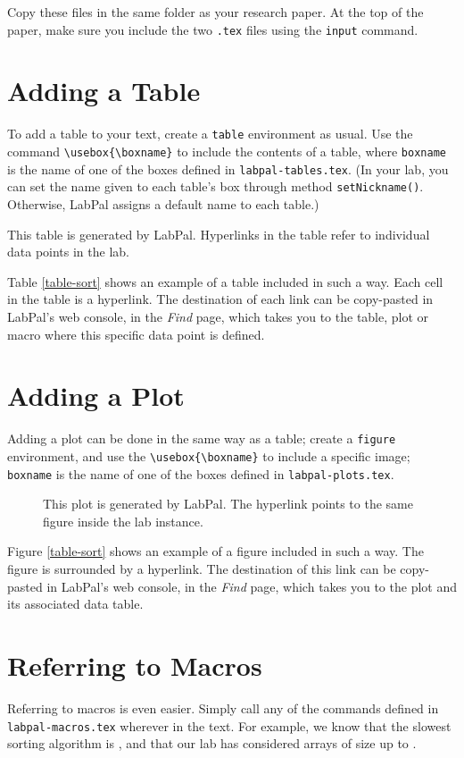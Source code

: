 \documentclass[utf8,twocolumn]{article}
\begin{document}
Copy these files in the same folder as your research paper. At the top
of the paper, make sure you include the two \texttt{.tex} files using the \texttt{input}
command.

\section*{Adding a Table}

To add a table to your text, create a \texttt{table} environment as usual. Use
the command \verb+\usebox{\boxname}+ to include the contents of a table, where
\verb+boxname+ is the name of one of the boxes defined in
\verb+labpal-tables.tex+. (In your lab, you can set the name given to each
table's box through method \verb+setNickname()+. Otherwise, LabPal assigns a
default name to each table.)

\begin{table}
\centering
\usebox{\sorttime}
\caption{This table is generated by LabPal. Hyperlinks in the table refer to
individual data points in the lab.}
\label{table-sort}
\end{table}

Table \ref{table-sort} shows an example of a table included in such a way. Each
cell in the table is a hyperlink. The destination of each link can be
copy-pasted in LabPal's web console, in the \textsl{Find} page, which takes you
to the table, plot or macro where this specific data point is defined.

\section*{Adding a Plot}

Adding a plot can be done in the same way as a table; create a \texttt{figure}
environment, and use the \verb+\usebox{\boxname}+ to include a specific image;
\verb+boxname+ is the name of one of the boxes defined in
\verb+labpal-plots.tex+.

\begin{figure}
\centering
\usebox{\sortplot}
\caption{This plot is generated by LabPal. The hyperlink points to the same
figure inside the lab instance.}
\end{figure}

Figure \ref{table-sort} shows an example of a figure included in such a way. The
figure is surrounded by a hyperlink. The destination of this link can be
copy-pasted in LabPal's web console, in the \textsl{Find} page, which takes you
to the plot and its associated data table.

\section*{Referring to Macros}

Referring to macros is even easier. Simply call any of the commands defined in
\verb+labpal-macros.tex+ wherever in the text. For example, we know that the
slowest sorting algorithm is \slowestAlgo{}, and that our lab has considered
arrays of size up to \maxSize{}.
\end{document}
